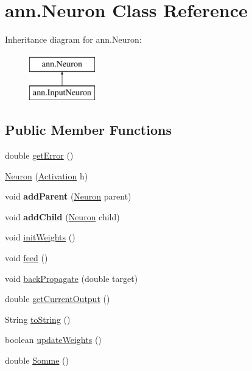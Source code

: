 \hypertarget{classann_1_1_neuron}{}\section{ann.\+Neuron Class Reference}
\label{classann_1_1_neuron}
Inheritance diagram for ann.\+Neuron\+:\begin{figure}[H]
\begin{center}
\leavevmode
\includegraphics[height=2.000000cm]{classann_1_1_neuron}
\end{center}
\end{figure}
\subsection*{Public Member Functions}
\begin{DoxyCompactItemize}
\item 
double \hyperlink{classann_1_1_neuron_adaea18e61d0a87b9e47cc41c552417dd}{get\+Error} ()
\item 
\hyperlink{classann_1_1_neuron_ab0f583ed1a1c83ed5ff5bc24c77db902}{Neuron} (\hyperlink{interfaceann_1_1_activation}{Activation} h)
\item 
\mbox{\label{classann_1_1_neuron_a0ba98646afe2473db08616ceffe80551}} 
void {\bfseries add\+Parent} (\hyperlink{classann_1_1_neuron}{Neuron} parent)
\item 
\mbox{\label{classann_1_1_neuron_a84df35de6af704840e26dd618ea62cdf}} 
void {\bfseries add\+Child} (\hyperlink{classann_1_1_neuron}{Neuron} child)
\item 
void \hyperlink{classann_1_1_neuron_aa1544b3c4a7e5a002eef88277126d4f5}{init\+Weights} ()
\item 
void \hyperlink{classann_1_1_neuron_aaae37fc2d90b1f42b4fd4ba00e23dc04}{feed} ()
\item 
void \hyperlink{classann_1_1_neuron_acb5bda80a06130b2c68bba370ee27a84}{back\+Propagate} (double target)
\item 
double \hyperlink{classann_1_1_neuron_ae8c43d9defae7bb44d8562382474f87c}{get\+Current\+Output} ()
\item 
String \hyperlink{classann_1_1_neuron_a22d903dc7a9e7693b77c3b407359a78a}{to\+String} ()
\item 
boolean \hyperlink{classann_1_1_neuron_abad6257063d27b721ad47e50a5f68e5e}{update\+Weights} ()
\item 
double \hyperlink{classann_1_1_neuron_a159491ed2840497a140c1beeb34c5ce5}{Somme} ()
\end{DoxyCompactItemize}
